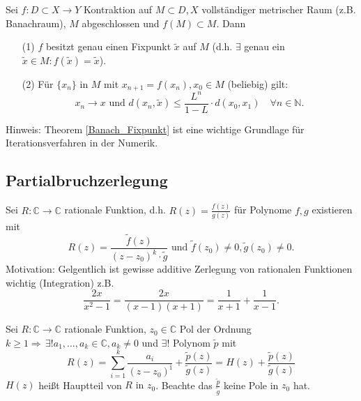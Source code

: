 \begin{theorem}\label{Banach_Fixpunkt}
    Sei $f : D\subset X \to Y$ Kontraktion auf $M \subset D, X$ vollständiger metrischer Raum (z.B. Banachraum), $M$ abgeschlossen und $f(M) \subset M$. Dann
    \begin{enumerate}
	    \item[(1)] $f$ besitzt genau einen Fixpunkt $\tilde{x}$ auf $M$ (d.h. $\exists$ genau ein $\tilde{x} \in M\colon f(\tilde{x}) = \tilde{x}$).
        \item[(2)] Für $\{x_n\}$ in $M$ mit $x_{n+1}=f(x_n),x_0 \in M$ (beliebig) gilt:
            \[
            x_n \to x \text{ und } d(x_n,\tilde{x}) \leq \frac{L^n}{1-L}\cdot d(x_0,x_1) \quad \forall n \in \mathbb{N}.
            \]
        \end{enumerate}
        Hinweis: Theorem \ref{Banach_Fixpunkt} ist eine wichtige Grundlage für Iterationsverfahren in der Numerik.
\end{theorem}

\subsection*{Partialbruchzerlegung}

\begin{definition}
    Sei $R: \mathbb{C} \to \mathbb{C}$ rationale Funktion, d.h. $R(z) = \frac{f(z)}{g(z)}$ für Polynome $f,g$ existieren mit
    \[
    R(z) = \frac{\tilde{f}(z)}{(z-z_0)^k\cdot \tilde{g}} \text{ und } \tilde{f}(z_0) \neq 0, \tilde{g}(z_0) \neq 0.
    \]
    Motivation: Gelgentlich ist gewisse additive Zerlegung von rationalen Funktionen wichtig (Integration) z.B.
    \[
    \frac{2x}{x^2 - 1} = \frac{2x}{(x-1)(x+1)} = \frac{1}{x+1}+\frac{1}{x-1}.
    \]
\end{definition}

\begin{lemma}
    Sei $R: \mathbb{C} \to \mathbb{C}$ rationale Funktion, $z_0 \in \mathbb{C}$ Pol der Ordnung $k\geq 1 \Rightarrow \,\exists ! a_1,\dots,a_k \in \mathbb{C},a_k\neq 0$ und $\exists !$ Polynom $\tilde{p}$ mit 
    \[
    R(z) = \sum_{i=1}^{k}
    \frac{a_i}{(z-z_0)^{î}} + \frac{\tilde{p}(z)}{\tilde{g}(z)} = H(z) +\frac{\tilde{p}(z)}{\tilde{g}(z)}
    \]
    $H(z)$ heißt Hauptteil von $R \text{ in } z_0$. Beachte das $\frac{\tilde{p}}{\tilde{g}}$ keine Pole in $z_0$ hat.
\end{lemma}


